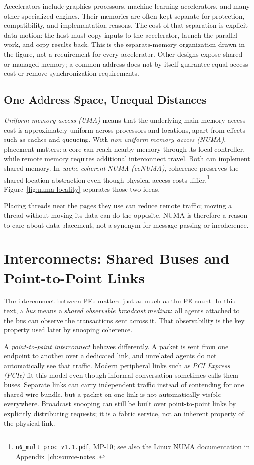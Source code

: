 Accelerators include graphics processors, machine-learning accelerators, and many other specialized engines.
Their memories are often kept separate for protection, compatibility, and implementation reasons.
The cost of that separation is explicit data motion: the host must copy inputs to the accelerator, launch the parallel work, and copy results back.
This is the separate-memory organization drawn in the figure, not a requirement for every accelerator.
Other designs expose shared or managed memory; a common address does not by itself guarantee equal access cost or remove synchronization requirements.

\subsection*{One Address Space, Unequal Distances}
\textit{Uniform memory access (UMA)} means that the underlying main-memory access cost is approximately uniform across processors and locations, apart from effects such as caches and queueing.
With \textit{non-uniform memory access (NUMA)}, placement matters: a core can reach nearby memory through its local controller, while remote memory requires additional interconnect travel.
Both can implement shared memory.
In \textit{cache-coherent NUMA (ccNUMA)}, coherence preserves the shared-location abstraction even though physical access costs differ.\footnote{\texttt{n6\_multiproc v1.1.pdf}, MP-10; see also the Linux NUMA documentation in Appendix~\ref{ch:source-notes}.}
Figure~\ref{fig:numa-locality} separates those two ideas.



Placing threads near the pages they use can reduce remote traffic; moving a thread without moving its data can do the opposite.
NUMA is therefore a reason to care about data placement, not a synonym for message passing or incoherence.


\section{Interconnects: Shared Buses and Point-to-Point Links}\label{sec:mp-interconnects}
The interconnect between PEs matters just as much as the PE count.
In this text, a \textit{bus} means a \textit{shared observable broadcast medium}: all agents attached to the bus can observe the transactions sent across it.
That observability is the key property used later by snooping coherence.

A \textit{point-to-point interconnect} behaves differently.
A packet is sent from one endpoint to another over a dedicated link, and unrelated agents do not automatically see that traffic.
Modern peripheral links such as \textit{PCI Express (PCIe)} fit this model even though informal conversation sometimes calls them buses.
Separate links can carry independent traffic instead of contending for one shared wire bundle, but a packet on one link is not automatically visible everywhere.
Broadcast snooping can still be built over point-to-point links by explicitly distributing requests; it is a fabric service, not an inherent property of the physical link.

